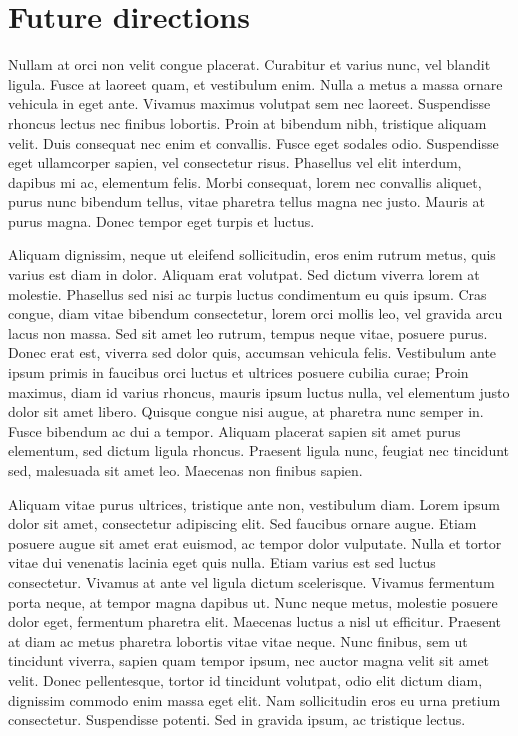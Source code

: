 \section{Future directions}

Nullam at orci non velit congue placerat. Curabitur et varius nunc, vel blandit ligula. Fusce at laoreet quam, et vestibulum enim. Nulla a metus a massa ornare vehicula in eget ante. Vivamus maximus volutpat sem nec laoreet. Suspendisse rhoncus lectus nec finibus lobortis. Proin at bibendum nibh, tristique aliquam velit. Duis consequat nec enim et convallis. Fusce eget sodales odio. Suspendisse eget ullamcorper sapien, vel consectetur risus. Phasellus vel elit interdum, dapibus mi ac, elementum felis. Morbi consequat, lorem nec convallis aliquet, purus nunc bibendum tellus, vitae pharetra tellus magna nec justo. Mauris at purus magna. Donec tempor eget turpis et luctus.

Aliquam dignissim, neque ut eleifend sollicitudin, eros enim rutrum metus, quis varius est diam in dolor. Aliquam erat volutpat. Sed dictum viverra lorem at molestie. Phasellus sed nisi ac turpis luctus condimentum eu quis ipsum. Cras congue, diam vitae bibendum consectetur, lorem orci mollis leo, vel gravida arcu lacus non massa. Sed sit amet leo rutrum, tempus neque vitae, posuere purus. Donec erat est, viverra sed dolor quis, accumsan vehicula felis. Vestibulum ante ipsum primis in faucibus orci luctus et ultrices posuere cubilia curae; Proin maximus, diam id varius rhoncus, mauris ipsum luctus nulla, vel elementum justo dolor sit amet libero. Quisque congue nisi augue, at pharetra nunc semper in. Fusce bibendum ac dui a tempor. Aliquam placerat sapien sit amet purus elementum, sed dictum ligula rhoncus. Praesent ligula nunc, feugiat nec tincidunt sed, malesuada sit amet leo. Maecenas non finibus sapien.

Aliquam vitae purus ultrices, tristique ante non, vestibulum diam. Lorem ipsum dolor sit amet, consectetur adipiscing elit. Sed faucibus ornare augue. Etiam posuere augue sit amet erat euismod, ac tempor dolor vulputate. Nulla et tortor vitae dui venenatis lacinia eget quis nulla. Etiam varius est sed luctus consectetur. Vivamus at ante vel ligula dictum scelerisque. Vivamus fermentum porta neque, at tempor magna dapibus ut. Nunc neque metus, molestie posuere dolor eget, fermentum pharetra elit. Maecenas luctus a nisl ut efficitur. Praesent at diam ac metus pharetra lobortis vitae vitae neque. Nunc finibus, sem ut tincidunt viverra, sapien quam tempor ipsum, nec auctor magna velit sit amet velit. Donec pellentesque, tortor id tincidunt volutpat, odio elit dictum diam, dignissim commodo enim massa eget elit. Nam sollicitudin eros eu urna pretium consectetur. Suspendisse potenti. Sed in gravida ipsum, ac tristique lectus.

